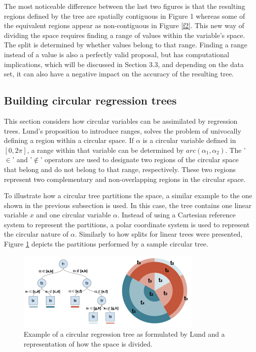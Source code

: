 \documentclass[times,twocolumn,final,authoryear]{elsarticle}
\begin{document}
The most noticeable difference between the last two figures is that the resulting regions defined by the tree are spatially contiguous in Figure 1 whereas some of the equivalent regions appear as non-contiguous in Figure \ref{f2}. This new way of dividing the space requires finding a range of values within the variable’s space. The split is determined by whether values belong to that range. Finding a range instead of a value is also a perfectly valid proposal, but has computational implications, which will be discussed in Section 3.3, and depending on the data set, it can also have a negative impact on the accuracy of the resulting tree.

\subsection{Building circular regression trees}

This section considers how circular variables can be assimilated by regression trees. Lund's proposition to introduce ranges, solves the problem of univocally defining a region within a circular space. If $\alpha$ is a circular variable defined in $[0, 2\pi]$, a range within that variable can be determined by $arc(\alpha_1, \alpha_2)$. The '$\in$' and '$\notin$' operators are used to designate two regions of the circular space that belong and do not belong to that range, respectively. These two regions represent two complementary and non-overlapping regions in the circular space.

To illustrate how a circular tree partitions the space, a similar example to the one shown in the previous subsection is used. In this case, the tree contains one linear variable $x$ and one circular variable $\alpha$. Instead of using a Cartesian reference system to represent the partitions, a polar coordinate system is used to represent the circular nature of $\alpha$. Similarly to how splits for linear trees were presented, Figure \ref{f3} depicts the partitions performed by a sample circular tree.

%
\begin{figure}
  \includegraphics[width=9cm]{fig3_master2.png}
\caption{Example of a circular regression tree as formulated by Lund and a representation of how the space is divided.}
\label{f3}       %
\end{figure}
%
\end{document}
